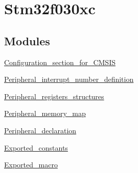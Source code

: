 \hypertarget{group__stm32f030xc}{}\section{Stm32f030xc}
\label{group__stm32f030xc}
\subsection*{Modules}
\begin{DoxyCompactItemize}
\item 
\hyperlink{group___configuration__section__for___c_m_s_i_s}{Configuration\+\_\+section\+\_\+for\+\_\+\+C\+M\+S\+IS}
\item 
\hyperlink{group___peripheral__interrupt__number__definition}{Peripheral\+\_\+interrupt\+\_\+number\+\_\+definition}
\item 
\hyperlink{group___peripheral__registers__structures}{Peripheral\+\_\+registers\+\_\+structures}
\item 
\hyperlink{group___peripheral__memory__map}{Peripheral\+\_\+memory\+\_\+map}
\item 
\hyperlink{group___peripheral__declaration}{Peripheral\+\_\+declaration}
\item 
\hyperlink{group___exported__constants}{Exported\+\_\+constants}
\item 
\hyperlink{group___exported__macro}{Exported\+\_\+macro}
\end{DoxyCompactItemize}
